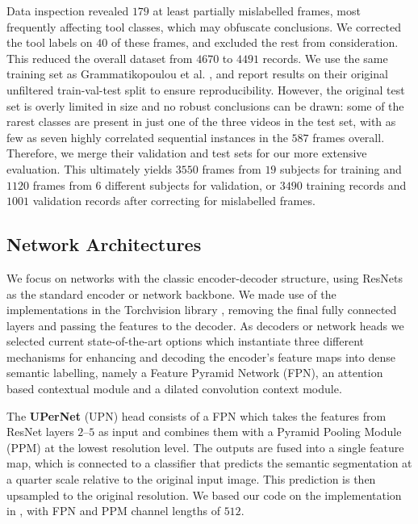 \documentclass[runningheads]{llncs}
\newcommand{\upr}{UPN}
\newcommand{\tbf}[1]{\textbf{#1}}
\begin{document}
Data inspection \cite{karpathy_recipe} revealed $179$ at least partially mislabelled frames, most frequently affecting tool classes, which may obfuscate conclusions. We corrected the tool labels on $40$ of these frames, and excluded the rest from consideration. This reduced the overall dataset from $4670$ to $4491$ records. We use the same training set as Grammatikopoulou et al. \cite{CaDIS}, and report results on their original unfiltered train-val-test split to ensure reproducibility. However, the original test set \cite{CaDIS} is overly limited in size and no robust conclusions can be drawn: some of the rarest classes are present in just one of the three videos in the test set, with as few as seven highly correlated sequential instances in the $587$ frames overall. Therefore, we merge their validation and test sets for our more extensive evaluation. This ultimately yields $3550$ frames from $19$ subjects for training and $1120$ frames from $6$ different subjects for validation, or $3490$ training records and $1001$ validation records after correcting for mislabelled frames.

\subsection{Network Architectures}\label{methods:architectures}
We focus on networks with the classic encoder-decoder structure, using ResNets \cite{ResNet} as the standard encoder or network backbone. We made use of the implementations in the Torchvision library \cite{torchvision}, removing the final fully connected layers and passing the features to the decoder. As decoders or network heads we selected current state-of-the-art options which instantiate three different mechanisms for enhancing and decoding the encoder's feature maps into dense semantic labelling, namely a Feature Pyramid Network (FPN), an attention based contextual module and a dilated convolution context module.

The \tbf{UPerNet} (\upr{}) head \cite{UPerNet} consists of a FPN which takes the features from ResNet layers $2$--$5$ as input and combines them with a Pyramid Pooling Module (PPM) at the lowest resolution level. The outputs are fused into a single feature map, which is connected to a classifier that predicts the semantic segmentation at a quarter scale relative to the original input image. This prediction is then upsampled to the original resolution. We based our code on the implementation in \cite{zhou2017scene,zhou2018semantic}, with FPN and PPM channel lengths of $512$.
\end{document}

